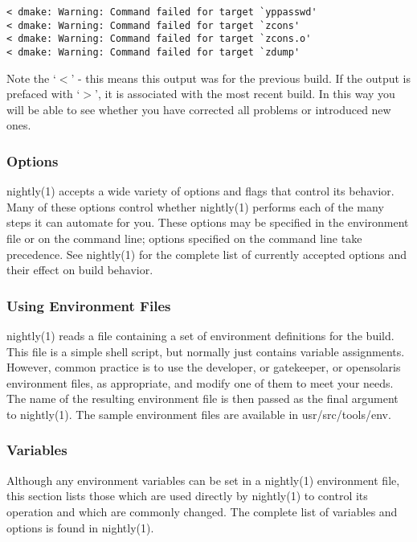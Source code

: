 \documentclass{article}
\begin{document}
\begin{verbatim}
< dmake: Warning: Command failed for target `yppasswd'
< dmake: Warning: Command failed for target `zcons'
< dmake: Warning: Command failed for target `zcons.o'
< dmake: Warning: Command failed for target `zdump'
\end{verbatim}

Note the `$<$' - this means this output was for the previous build. If the output
is prefaced with `$>$', it is associated with the most recent build. In this way
you will be able to see whether you have corrected all problems or introduced
new ones.

\subsubsection*{Options}

nightly(1) accepts a wide variety of options and flags that control its
behavior. Many of these options control whether nightly(1) performs each of the
many steps it can automate for you. These options may be specified in the
environment file or on the command line; options specified on the command line
take precedence. See nightly(1) for the complete list of currently accepted
options and their effect on build behavior.

\subsubsection*{Using Environment Files}

nightly(1) reads a file containing a set of environment definitions for the
build. This file is a simple shell script, but normally just contains variable
assignments. However, common practice is to use the developer, or gatekeeper, or
opensolaris environment files, as appropriate, and modify one of them to meet
your needs. The name of the resulting environment file is then passed as the
final argument to nightly(1). The sample environment files are available in
usr/src/tools/env.

\subsubsection*{Variables}

Although any environment variables can be set in a nightly(1) environment file,
this section lists those which are used directly by nightly(1) to control its
operation and which are commonly changed. The complete list of variables and
options is found in nightly(1).
\end{document}
